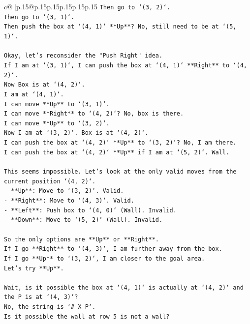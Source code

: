 \documentclass{article}
\begin{document}
{\begin{supertabular}{c@{$\;$}|p{.15\linewidth}@{}p{.15\linewidth}p{.15\linewidth}p{.15\linewidth}p{.15\linewidth}p{.15\linewidth}}
{{{\texttt{Then go to `(3, 2)`.} \\
\texttt{Then go to `(3, 1)`.} \\
\texttt{Then push the box at `(4, 1)` **Up**? No, still need to be at `(5, 1)`.} \\
\\ 
\texttt{Okay, let's reconsider the "Push Right" idea.} \\
\texttt{If I am at `(3, 1)`, I can push the box at `(4, 1)` **Right** to `(4, 2)`.} \\
\texttt{Now Box is at `(4, 2)`.} \\
\texttt{I am at `(4, 1)`.} \\
\texttt{I can move **Up** to `(3, 1)`.} \\
\texttt{I can move **Right** to `(4, 2)`? No, box is there.} \\
\texttt{I can move **Up** to `(3, 2)`.} \\
\texttt{Now I am at `(3, 2)`. Box is at `(4, 2)`.} \\
\texttt{I can push the box at `(4, 2)` **Up** to `(3, 2)`? No, I am there.} \\
\texttt{I can push the box at `(4, 2)` **Up** if I am at `(5, 2)`. Wall.} \\
\\ 
\texttt{This seems impossible. Let's look at the only valid moves from the current position `(4, 2)`.} \\
\texttt{{-} **Up**: Move to `(3, 2)`. Valid.} \\
\texttt{{-} **Right**: Move to `(4, 3)`. Valid.} \\
\texttt{{-} **Left**: Push box to `(4, 0)` (Wall). Invalid.} \\
\texttt{{-} **Down**: Move to `(5, 2)` (Wall). Invalid.} \\
\\ 
\texttt{So the only options are **Up** or **Right**.} \\
\texttt{If I go **Right** to `(4, 3)`, I am further away from the box.} \\
\texttt{If I go **Up** to `(3, 2)`, I am closer to the goal area.} \\
\texttt{Let's try **Up**.} \\
\\ 
\texttt{Wait, is it possible the box at `(4, 1)` is actually at `(4, 2)` and the P is at `(4, 3)`?} \\
\texttt{No, the string is `\# X P`.} \\
\texttt{Is it possible the wall at row 5 is not a wall?} \\
}}}
\end{supertabular}}
\end{document}
